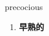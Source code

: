 
\begin{frame}
{\huge precocious}
\begin{center}
\begin{enumerate}\Large
  \item \textbf{早熟的}
\end{enumerate}
\end{center}
\end{frame}
